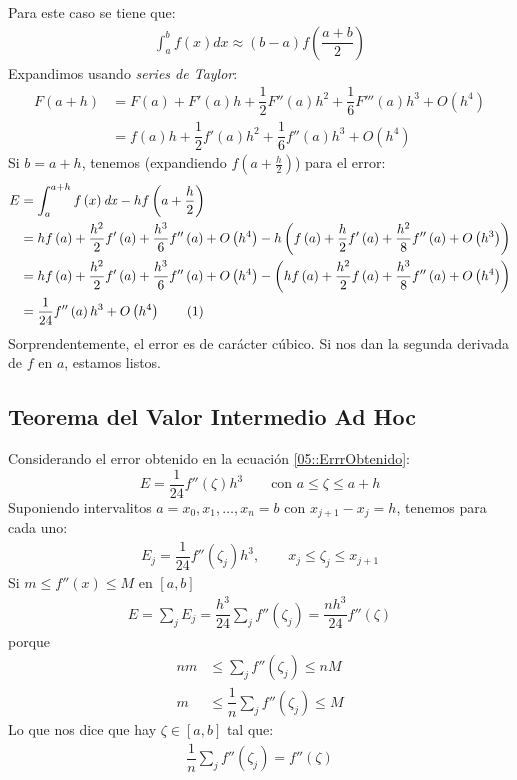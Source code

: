 \documentclass[english, spanish, fleqn, 10pt]{article}
\numberwithin{equation}{section}
\newcommand{\nparentesis}[1]{\left( #1 \right)}
\newcommand{\ncorchetes}[1]{\left[ #1 \right]}
\theoremstyle{definition}
\newcommand\numberthis{\addtocounter{equation}{1}\tag{\theequation}}
\begin{document}
Para este caso se tiene que:
\begin{align*}
\int_{a}^{b}f\nparentesis{x}\mathit{dx}\approx\nparentesis{b-a}f\nparentesis{\dfrac{a+b}{2}}
\end{align*}
Expandimos usando \textit{series de Taylor}:
\begin{align*}
F\nparentesis{a+h}&=F\nparentesis{a}+F'\nparentesis{a}h+\dfrac{1}{2}F''\nparentesis{a}h^2+\dfrac{1}{6}F'''\nparentesis{a}h^3+O\nparentesis{h^4}\\
&=f\nparentesis{a}h+\dfrac{1}{2}f'\nparentesis{a}h^2+\dfrac{1}{6}f''\nparentesis{a}h^3+O\nparentesis{h^4}
\end{align*}
Si $b=a+h$, tenemos (expandiendo $f\nparentesis{a+\frac{h}{2}}$) para el error:
\begin{align*}
E&=\int_{a}^{a+h}f\nparentesis{x}\mathit{dx}-hf\nparentesis{a+\dfrac{h}{2}}\\
&=hf\nparentesis{a}+\dfrac{h^2}{2}f'\nparentesis{a}+\dfrac{h^3}{6}f''\nparentesis{a}+O\nparentesis{h^4}-h\nparentesis{f\nparentesis{a}+\dfrac{h}{2}f'\nparentesis{a}+\dfrac{h^2}{8}f''\nparentesis{a}+O\nparentesis{h^3}}\\
&=hf\nparentesis{a}+\dfrac{h^2}{2}f'\nparentesis{a}+\dfrac{h^3}{6}f''\nparentesis{a}+O\nparentesis{h^4}-\nparentesis{hf\nparentesis{a}+\dfrac{h^2}{2}f\nparentesis{a}+\dfrac{h^3}{8}f''\nparentesis{a}+O\nparentesis{h^4}}\\
&=\dfrac{1}{24}f''\nparentesis{a}h^3+O\nparentesis{h^4}\numberthis\label{05::ErrrObtenido}
\end{align*}
Sorprendentemente, el error es de carácter cúbico. Si nos dan la segunda derivada de $f$ en $a$, estamos listos.

\subsection{Teorema del Valor Intermedio Ad Hoc}
Considerando el error obtenido en la ecuación \eqref{05::ErrrObtenido}:
\begin{equation}
E=\dfrac{1}{24}f''\nparentesis{\zeta}h^3\qquad \text{con }a\leq \zeta \leq a+h
\end{equation}
Suponiendo intervalitos $a=x_0, x_1, \ldots, x_n =b$ con $x_{j+1}-x_j=h$, tenemos para cada uno:
\begin{align*}
E_j=\dfrac{1}{24}f''\nparentesis{\zeta_j}h^3, \qquad x_j\leq \zeta _j \leq x_{j+1}
\end{align*}
Si $m\leq f''\nparentesis{x}\leq M$ en $\ncorchetes{a, b}$
\begin{align*}
E=\sum_{j}E_j=\dfrac{h^3}{24}\sum_j f''\nparentesis{\zeta _j}=\dfrac{nh^3}{24}f''\nparentesis{\zeta}
\end{align*}
porque
\begin{align*}
nm&\leq \sum_j f''\nparentesis{\zeta_j} \leq nM\\
m&\leq \dfrac{1}{n}\sum_j f''\nparentesis{\zeta_j}\leq M
\end{align*}
Lo que nos dice que hay $\zeta \in \ncorchetes{a, b}$ tal que:
\begin{align*}
\dfrac{1}{n}\sum_j f''\nparentesis{\zeta_j}=f''\nparentesis{\zeta}
\end{align*}
\end{document}
